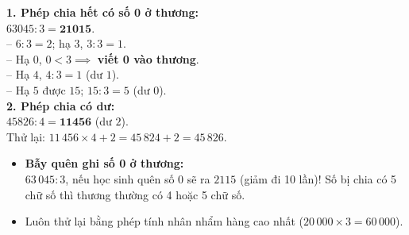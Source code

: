 \documentclass[11pt,a4paper]{article}
\begin{document}
\vspace{-2.5mm}
\noindent
\begin{minipage}[t]{0.49\textwidth}\vspace{0pt}
\begin{tcolorbox}[
  enhanced,
  colback=green!4!white,
  colframe=green!60!black,
  arc=2mm, boxrule=0.8pt,
  left=2mm, right=2mm, top=1.8mm, bottom=1.8mm,
  title={\footnotesize\bfseries\color{white}\faCheckCircle\ Ví dụ thực hành chuẩn mực}
]
{\footnotesize
\textbf{1. Phép chia hết có số 0 ở thương:}\\
$63045 : 3 = \mathbf{21015}$.\\
-- $6 : 3 = 2$; hạ $3$, $3 : 3 = 1$.\\
-- Hạ $0$, $0 < 3 \implies$ \textbf{viết 0 vào thương}.\\
-- Hạ $4$, $4 : 3 = 1$ (dư $1$).\\
-- Hạ $5$ được $15$; $15 : 3 = 5$ (dư $0$).\\
\textbf{2. Phép chia có dư:}\\
$45826 : 4 = \mathbf{11456}$ (dư $2$).\\
Thử lại: $11\,456 \times 4 + 2 = 45\,824 + 2 = 45\,826$.
}
\end{tcolorbox}
\end{minipage}
\hfill
\begin{minipage}[t]{0.49\textwidth}\vspace{0pt}
\begin{tcolorbox}[
  enhanced,
  colback=red!4!white,
  colframe=red!70!black,
  arc=2mm, boxrule=0.8pt,
  left=2mm, right=2mm, top=1.8mm, bottom=1.8mm,
  title={\footnotesize\bfseries\color{white}\faExclamationTriangle\ Mẹo tránh bẫy trắc nghiệm}
]
{\footnotesize
\begin{itemize}\setlength{\itemsep}{1.5pt}\setlength{\leftskip}{-2.5mm}
  \item \textbf{Bẫy quên ghi số 0 ở thương:}\\
  $63\,045 : 3$, nếu học sinh quên số 0 sẽ ra $2115$ (giảm đi 10 lần)! Số bị chia có 5 chữ số thì thương thường có 4 hoặc 5 chữ số.
  \item Luôn thử lại bằng phép tính nhân nhẩm hàng cao nhất ($20\,000 \times 3 = 60\,000$).
\end{itemize}
}
\end{tcolorbox}
\end{minipage}
\end{document}
